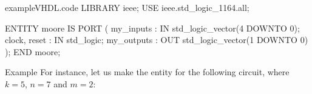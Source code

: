 \documentclass[a4paper]{article}
\begin{document}
\begin{filecontents*}[overwrite]{exampleVHDL.code}
LIBRARY ieee;
USE ieee.std_logic_1164.all;

ENTITY moore IS
    PORT (
        my_inputs  : IN std_logic_vector(4 DOWNTO 0);
        clock, reset : IN std_logic;
        my_outputs : OUT std_logic_vector(1 DOWNTO 0)
    );
END moore;
\end{filecontents*}

\begin{parag}{Example}
    For instance, let us make the entity for the following circuit, where $k = 5$, $n = 7$ and $m = 2$:

\end{parag}
\end{document}
